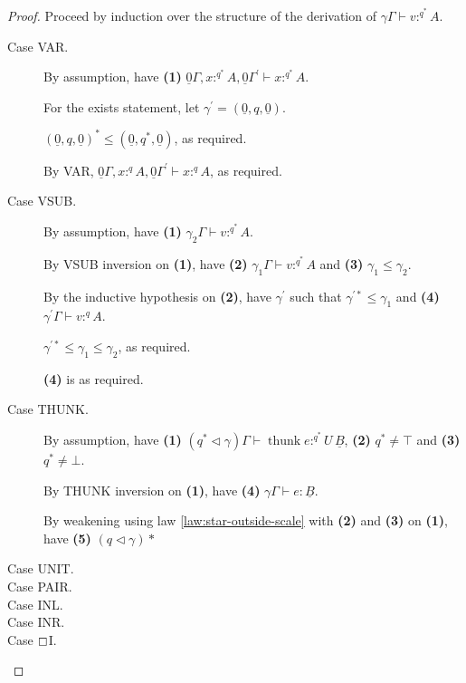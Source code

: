 \documentclass[acmsmall,screen,nonacm]{acmart}
\DeclareMathOperator{\thunk}{\text{thunk}}
\newcommand{\tee}{\vdash}
\DeclareMathOperator{\scale}{\mathbin{\triangleleft}}
\begin{document}
\begin{proof}
  Proceed by induction over the structure of the derivation of $\gamma\Gamma \tee v :^{q^*} A$.

  \begin{description}
    \item[Case VAR.]
    By assumption, have \textbf{(1)} $\underline{0}\Gamma, x :^{q^*} A, \underline{0}\Gamma^\prime \tee x :^{q^*} A$.

    For the exists statement, let $\gamma^\prime = (\underline{0}, q, \underline{0})$.

    $(\underline{0}, q, \underline{0})^* \le (\underline{0}, q^*, \underline{0})$, as required.

    By VAR, $\underline{0}\Gamma, x :^q A, \underline{0}\Gamma^\prime \tee x :^q A$, as required.
    \\
    \item[Case VSUB.]
    By assumption, have \textbf{(1)} $\gamma_2\Gamma \tee v :^{q^*} A$.

    By VSUB inversion on \textbf{(1)}, have \textbf{(2)} $\gamma_1\Gamma \tee v :^{q^*} A$ and \textbf{(3)} $\gamma_1 \le \gamma_2$.

    By the inductive hypothesis on \textbf{(2)}, have $\gamma^\prime$ such that $\gamma^{\prime*} \le \gamma_1$ and \textbf{(4)} $\gamma^\prime\Gamma \tee v :^q A.$

    $\gamma^{\prime*} \le \gamma_1 \le \gamma_2$, as required.

    \textbf{(4)} is as required.
    \\
    \item[Case THUNK.]
    By assumption, have \textbf{(1)} $(q^* \scale \gamma)\Gamma \tee \thunk e :^{q^*} U \, \underline{B}$, \textbf{(2)} $q^* \neq \top$ and \textbf{(3)} $q^* \neq \bot$.

    By THUNK inversion on \textbf{(1)}, have \textbf{(4)} $\gamma\Gamma \tee e : \underline{B}$.

    By weakening using law \ref{law:star-outside-scale} with \textbf{(2)} and \textbf{(3)} on \textbf{(1)}, have \textbf{(5)} $(q \scale \gamma)*$
    \\
    \item[Case UNIT.]
    \item[Case PAIR.]
    \item[Case INL.]
    \item[Case INR.]
    \item[Case $\boxempty$I.]
  \end{description}
\end{proof}
\end{document}
